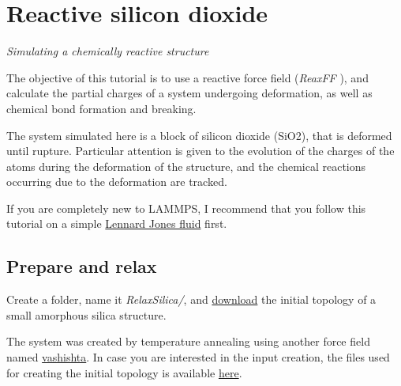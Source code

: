 \chapter{Reactive silicon dioxide}
\label{reactive-silicon-dioxide-label}

\noindent \vspace{-1cm} \noindent \textcolor{graytitle}{\textit{{\Large Simulating a chemically reactive structure}}\vspace{0.5cm} }

\vspace{0.25cm} \noindent The objective of this tutorial is to use a 
reactive force field (\textit{ReaxFF} \cite{van2001reaxff, zou2012investigation}),
and calculate the partial charges of a system undergoing
deformation, as well as chemical bond formation and breaking.  

\vspace{0.25cm} \noindent The system simulated here is a block of silicon dioxide (SiO2), that is deformed 
until rupture. Particular attention is given to the evolution of the charges
of the atoms during the deformation of the structure, and 
the chemical reactions occurring due to the deformation
are tracked.

\vspace{0.25cm} \noindent If you are completely new to LAMMPS, I recommend that
you follow this tutorial on a simple \hyperref[lennard-jones-label]{Lennard Jones fluid} first.

\section{Prepare and relax}
\noindent Create a folder, name it \textit{RelaxSilica/},
and \href{https://lammpstutorials.github.io/lammpstutorials-inputs/level3/reactive-silicon-dioxide/RelaxSilica/silica.data}{download} the initial topology of a small
amorphous silica structure.

\begin{tcolorbox}[colback=mylightblue!5!white,colframe=mylightblue!75!black,title=About the initial structure]

\vspace{0.25cm} \noindent The system was created by temperature annealing using another force field 
named \href{https://lammpstutorials.github.io/lammpstutorials-inputs/level3/reactive-silicon-dioxide/CreateSilica/SiO.1990.vashishta}{vashishta}. In case you are
interested in the input creation, the files
used for creating the initial topology is available
\href{https://lammpstutorials.github.io/lammpstutorials-inputs/level3/reactive-silicon-dioxide/CreateSilica/input.lammps}{here}.
\end{tcolorbox}

